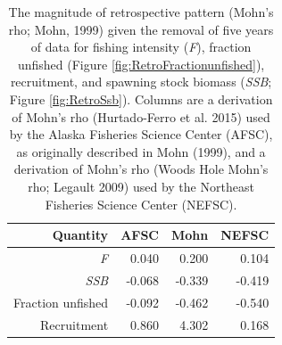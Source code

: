 \begin{table}
\centering
\caption{\label{tab:RetroMohnsrho}The magnitude of retrospective pattern (Mohn's rho; Mohn, 1999) given the removal of five years of data for fishing intensity (\emph{F}), fraction unfished (Figure \ref{fig:RetroFractionunfished}),  recruitment, and spawning stock biomass (\emph{SSB}; Figure \ref{fig:RetroSsb}). Columns are a derivation of Mohn's rho (Hurtado-Ferro et al. 2015) used by the Alaska Fisheries Science Center (AFSC), as originally described in Mohn (1999), and a derivation of Mohn's rho (Woods Hole Mohn's rho; Legault 2009) used by the Northeast Fisheries Science Center (NEFSC).}
\centering
\begin{tabular}[t]{rrrr}
\toprule
Quantity & AFSC & Mohn & NEFSC\\
\midrule
\emph{F} & 0.040 & 0.200 & 0.104\\
\emph{SSB} & -0.068 & -0.339 & -0.419\\
Fraction unfished & -0.092 & -0.462 & -0.540\\
Recruitment & 0.860 & 4.302 & 0.168\\
\bottomrule
\end{tabular}
\end{table}
